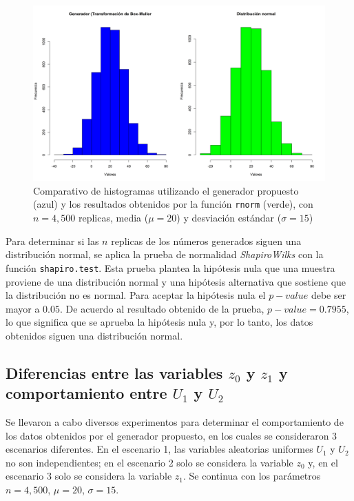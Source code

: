 \documentclass{article}
\begin{document}
\begin{figure}
\centering
\includegraphics[width=\linewidth]{Figures/comparativonormal.png}
\caption{Comparativo de histogramas utilizando el generador propuesto (azul) y los resultados obtenidos por la función \texttt{rnorm} (verde), con $n= 4,500$ replicas, media ($\mu = 20$) y desviación estándar ($\sigma = 15$)}
\label{pseudonormal}
\end{figure}


Para determinar si las $n$ replicas de los números generados siguen una distribución normal, se aplica la prueba de normalidad \textit{Shapiro\textendash Wilks} con la función \texttt{shapiro.test}. Esta prueba plantea la hipótesis nula que una muestra proviene de una distribución normal y una hipótesis alternativa que sostiene que la distribución no es normal. Para aceptar la hipótesis nula el $p-value$ debe ser mayor a $0.05$. De acuerdo al resultado obtenido de la prueba,  $p-value = 0.7955$, lo que significa que se aprueba la hipótesis nula y, por lo tanto, los datos obtenidos siguen una distribución normal.


\subsection{Diferencias entre las variables $z_{0}$ y $z_{1}$ y comportamiento entre $U_{1}$ y $U_{2}$}

Se llevaron a cabo diversos experimentos para determinar el comportamiento de los datos obtenidos por el generador propuesto, en los cuales se consideraron $3$ escenarios diferentes. En el escenario 1, las variables aleatorias uniformes $U_{1}$ y $U_{2}$ no son independientes; en el escenario 2 solo se considera la variable $z_{0}$ y, en el escenario 3 solo se considera la variable $z_{1}$. Se continua con los parámetros $n=4,500$, $\mu = 20$, $\sigma = 15$.
\end{document}
